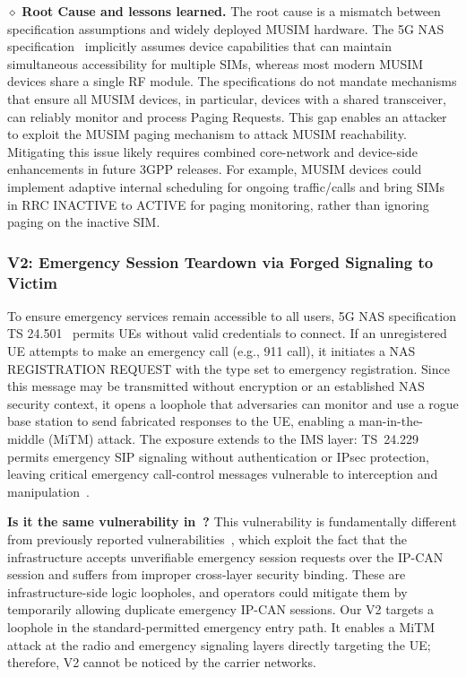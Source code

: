\documentclass[sigconf]{acmart}
\begin{document}
{\noindent $\diamond$ \textbf{Root Cause and lessons learned.} 
The root cause is a mismatch between specification assumptions and widely deployed MUSIM hardware. The 5G NAS specification~\cite{3GPP_TS_24501} implicitly assumes device capabilities that can maintain simultaneous accessibility for multiple SIMs, whereas most modern MUSIM devices share a single RF module. The specifications do not mandate mechanisms that ensure all MUSIM devices, in particular, devices with a shared transceiver, can reliably monitor and process Paging Requests. This gap enables an attacker to exploit the MUSIM paging mechanism to attack MUSIM reachability.  Mitigating this issue likely requires combined core-network and device-side enhancements in future 3GPP releases. For example, MUSIM devices could implement adaptive internal scheduling for ongoing traffic/calls and bring SIMs in RRC INACTIVE to ACTIVE for paging monitoring, rather than ignoring paging on the inactive SIM. 

\vspace{-0.10in}
\subsubsection{V2: Emergency Session Teardown via Forged Signaling to Victim} 
\noindent To ensure emergency services remain accessible to all users, 5G NAS specification TS 24.501~\cite{3GPP_TS_24501} permits UEs without valid credentials to connect. If an unregistered UE attempts to make an emergency call (e.g., 911 call), it initiates a NAS REGISTRATION REQUEST with the type set to emergency registration. Since this message may be transmitted without encryption or an established NAS security context, it opens a loophole that adversaries can monitor and use a rogue base station to send fabricated responses to the UE, enabling a man-in-the-middle (MiTM) attack. 
The exposure extends to the IMS layer: TS~24.229 permits emergency SIP signaling without authentication or IPsec protection, leaving critical emergency call-control messages vulnerable to interception and manipulation~\cite{hu2024uncovering, 10479537, inproceedings,10.1145/3599184.3599195}. 

\noindent \textbf{Is it the same vulnerability in~\cite{hu2022uncovering}?} This vulnerability is fundamentally different from previously reported vulnerabilities~\cite{hu2022uncovering}, which exploit the fact that the infrastructure accepts unverifiable emergency session requests over the IP-CAN session and suffers from improper cross-layer security binding. These are infrastructure-side logic loopholes, and operators could mitigate them by temporarily allowing duplicate emergency IP-CAN sessions. Our V2 targets a loophole in the standard-permitted emergency entry path. It enables a MiTM attack at the radio and emergency signaling layers directly targeting the UE; therefore, V2 cannot be noticed by the carrier networks.

}
\end{document}
